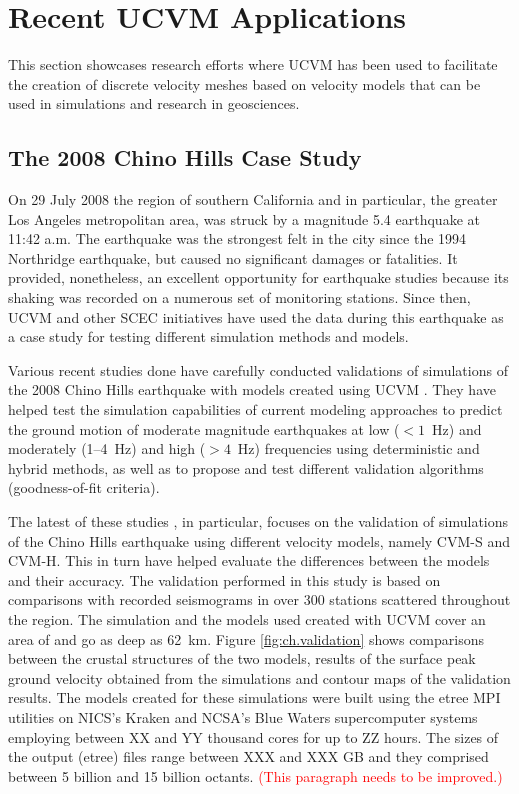 
\section{Recent UCVM Applications}

This section showcases research efforts where UCVM has been used to facilitate the creation of discrete velocity meshes based on velocity models that can be used in simulations and research in geosciences.

\subsection{The 2008 Chino Hills Case Study}

On 29 July 2008 the region of southern California and in particular, the greater Los Angeles metropolitan area, was struck by a magnitude  5.4 earthquake at 11:42 a.m. The earthquake was the strongest felt in the city since the 1994 Northridge earthquake, but caused no significant damages or fatalities. It provided, nonetheless, an excellent opportunity for earthquake studies because its shaking was recorded on a numerous set of monitoring stations. Since then, UCVM and other SCEC initiatives have used the data during this earthquake as a case study for testing different simulation methods and models. 

Various recent studies done have carefully conducted validations of simulations of the 2008 Chino Hills earthquake with models created using UCVM \citep[e.g.,][]{Olsen_2010_SRL, Taborda_2013_BSSA, Taborda_2014_BSSA}. They have helped test the simulation capabilities of current modeling approaches to predict the ground motion of moderate magnitude earthquakes at low ($<1$~Hz) and moderately (1--4~Hz) and high ($>4$~Hz) frequencies using deterministic and hybrid methods, as well as to propose and test different validation algorithms (goodness-of-fit criteria). 

The latest of these studies \citep{Taborda_2014_BSSA}, in particular, focuses on the validation of simulations of the Chino Hills earthquake using different velocity models, namely CVM-S and CVM-H. This in turn have helped evaluate the differences between the models and their accuracy. The validation performed in this study is based on comparisons with recorded seismograms in over 300 stations scattered throughout the region. The simulation and the models used created with UCVM cover an area of  and go as deep as 62~km. Figure \ref{fig:ch.validation} shows comparisons between the crustal structures of the two models, results of the surface peak ground velocity obtained from the simulations and contour maps of the validation results. The models created for these simulations were built using the etree MPI utilities on NICS's Kraken and NCSA's Blue Waters supercomputer systems employing between XX and YY thousand cores for up to ZZ hours. The sizes of the output (etree) files range between XXX and XXX GB and they comprised between 5 billion and 15 billion octants. \textcolor{red}{(This paragraph needs to be improved.)}

